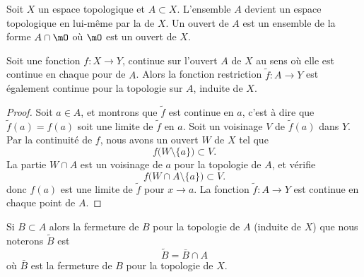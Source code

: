 \begin{definition}  \label{DefVLrgWDB}
Soit \( X\) un espace topologique et \( A\subset X\). L'ensemble \( A\) devient un espace topologique en lui-même par la  de \( X\). Un ouvert de \( A\) est un ensemble de la forme \( A\cap\mO\) où \( \mO\) est un ouvert de \( X\).
\end{definition}

\begin{proposition}     \label{PROPooNPLBooPfmmym}
    Soit une fonction \( f\colon X\to Y\), continue sur l'ouvert \( A\) de \( X\) au sens où elle est continue en chaque pour de \( A\). Alors la fonction restriction \( \tilde f\colon A\to Y\) est également continue pour la topologie sur \( A\), induite de \( X\).
\end{proposition}

\begin{proof}
    Soit \( a\in A\), et montrons que \( \tilde f\) est continue en \( a\), c'est à dire que \( \tilde f(a)=f(a)\) soit une limite de \( \tilde f\) en \( a\). Soit un voisinage \( V\) de \( \tilde f(a)\) dans \( Y\). Par la continuité de \( f\), nous avons un ouvert \( W\) de \( X\) tel que 
    \begin{equation}
        f\big( W\setminus\{ a \} \big)\subset V.
    \end{equation}
    La partie \( W\cap A\) est un voisinage de \( a\) pour la topologie de \( A\), et vérifie
    \begin{equation}
        f\big( W\cap A\setminus\{ a \} \big)\subset V.
    \end{equation}
    donc \( f(a)\) est une limite de \( \tilde f\) pour \( x\to a\). La fonction \( \tilde f\colon A\to Y\) est continue en chaque point de \( A\).
\end{proof}

\begin{lemma}       \label{LemkUYkQt}
    Si \( B\subset A\) alors la fermeture de \( B\) pour la topologie de \( A\) (induite de \( X\)) que nous noterons \( \tilde B\) est
    \begin{equation}
        \tilde B=\bar B\cap A
    \end{equation}
    où \( \bar B\) est la fermeture de \( B\) pour la topologie de \( X\).
\end{lemma}


